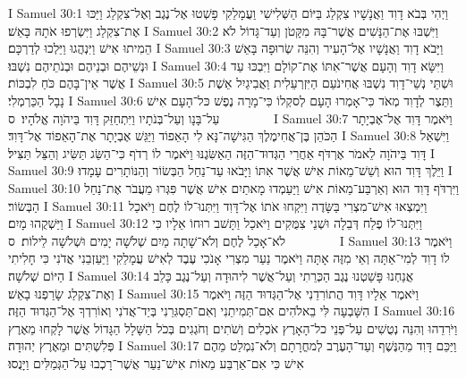 I Samuel 30:1	וַיְהִי בְּבֹא דָוִד וַאֲנָשָׁיו צִקְלַג בַּיּוֹם הַשְּׁלִישִׁי וַעֲמָלֵקִי פָשְׁטוּ אֶל־נֶגֶב וְאֶל־צִקְלַג וַיַּכּוּ אֶת־צִקְלַג וַיִּשְׂרְפוּ אֹתָהּ בָּאֵשׁ׃
I Samuel 30:2	וַיִּשְׁבּוּ אֶת־הַנָּשִׁים אֲשֶׁר־בָּהּ מִקָּטֹן וְעַד־גָּדוֹל לֹא הֵמִיתוּ אִישׁ וַיִּנְהֲגוּ וַיֵּלְכוּ לְדַרְכָּם׃
I Samuel 30:3	וַיָּבֹא דָוִד וַאֲנָשָׁיו אֶל־הָעִיר וְהִנֵּה שְׂרוּפָה בָּאֵשׁ וּנְשֵׁיהֶם וּבְנֵיהֶם וּבְנֹתֵיהֶם נִשְׁבּוּ׃
I Samuel 30:4	וַיִּשָּׂא דָוִד וְהָעָם אֲשֶׁר־אִתּוֹ אֶת־קוֹלָם וַיִּבְכּוּ עַד אֲשֶׁר אֵין־בָּהֶם כֹּחַ לִבְכּוֹת׃
I Samuel 30:5	וּשְׁתֵּי נְשֵׁי־דָוִד נִשְׁבּוּ אֲחִינֹעַם הַיִּזְרְעֵלִית וַאֲבִיגַיִל אֵשֶׁת נָבָל הַכַּרְמְלִי׃
I Samuel 30:6	וַתֵּצֶר לְדָוִד מְאֹד כִּי־אָמְרוּ הָעָם לְסקְלוֹ כִּי־מָרָה נֶפֶשׁ כּל־הָעָם אִישׁ עַל־בָּנָו וְעַל־בְּנֹתָיו וַיִּתְחַזֵּק דָּוִד בַּיהֹוָה אֱלֹהָיו׃ {ס}        
I Samuel 30:7	וַיֹּאמֶר דָּוִד אֶל־אֶבְיָתָר הַכֹּהֵן בֶּן־אֲחִימֶלֶךְ הַגִּישָׁה־נָּא לִי הָאֵפוֹד וַיַּגֵּשׁ אֶבְיָתָר אֶת־הָאֵפוֹד אֶל־דָּוִד׃
I Samuel 30:8	וַיִּשְׁאַל דָּוִד בַּיהֹוָה לֵאמֹר אֶרְדֹּף אַחֲרֵי הַגְּדוּד־הַזֶּה הַאַשִּׂגֶנּוּ וַיֹּאמֶר לוֹ רְדֹף כִּי־הַשֵּׂג תַּשִּׂיג וְהַצֵּל תַּצִּיל׃
I Samuel 30:9	וַיֵּלֶךְ דָּוִד הוּא וְשֵׁשׁ־מֵאוֹת אִישׁ אֲשֶׁר אִתּוֹ וַיָּבֹאוּ עַד־נַחַל הַבְּשׂוֹר וְהַנּוֹתָרִים עָמָדוּ׃
I Samuel 30:10	וַיִּרְדֹּף דָּוִד הוּא וְאַרְבַּע־מֵאוֹת אִישׁ וַיַּעַמְדוּ מָאתַיִם אִישׁ אֲשֶׁר פִּגְּרוּ מֵעֲבֹר אֶת־נַחַל הַבְּשׂוֹר׃
I Samuel 30:11	וַיִּמְצְאוּ אִישׁ־מִצְרִי בַּשָּׂדֶה וַיִּקְחוּ אֹתוֹ אֶל־דָּוִד וַיִּתְּנוּ־לוֹ לֶחֶם וַיֹּאכַל וַיַּשְׁקֻהוּ מָיִם׃
I Samuel 30:12	וַיִּתְּנוּ־לוֹ פֶלַח דְּבֵלָה וּשְׁנֵי צִמֻּקִים וַיֹּאכַל וַתָּשׁב רוּחוֹ אֵלָיו כִּי לֹא־אָכַל לֶחֶם וְלֹא־שָׁתָה מַיִם שְׁלֹשָׁה יָמִים וּשְׁלֹשָׁה לֵילוֹת׃ {ס}        
I Samuel 30:13	וַיֹּאמֶר לוֹ דָוִד לְמִי־אַתָּה וְאֵי מִזֶּה אָתָּה וַיֹּאמֶר נַעַר מִצְרִי אָנֹכִי עֶבֶד לְאִישׁ עֲמָלֵקִי וַיַּעַזְבֵנִי אֲדֹנִי כִּי חָלִיתִי הַיּוֹם שְׁלֹשָׁה׃
I Samuel 30:14	אֲנַחְנוּ פָּשַׁטְנוּ נֶגֶב הַכְּרֵתִי וְעַל־אֲשֶׁר לִיהוּדָה וְעַל־נֶגֶב כָּלֵב וְאֶת־צִקְלַג שָׂרַפְנוּ בָאֵשׁ׃
I Samuel 30:15	וַיֹּאמֶר אֵלָיו דָּוִד הֲתוֹרִדֵנִי אֶל־הַגְּדוּד הַזֶּה וַיֹּאמֶר הִשָּׁבְעָה לִּי בֵאלֹהִים אִם־תְּמִיתֵנִי וְאִם־תַּסְגִּרֵנִי בְּיַד־אֲדֹנִי וְאוֹרִדְךָ אֶל־הַגְּדוּד הַזֶּה׃
I Samuel 30:16	וַיֹּרִדֵהוּ וְהִנֵּה נְטֻשִׁים עַל־פְּנֵי כל־הָאָרֶץ אֹכְלִים וְשֹׁתִים וְחֹגְגִים בְּכֹל הַשָּׁלָל הַגָּדוֹל אֲשֶׁר לָקְחוּ מֵאֶרֶץ פְּלִשְׁתִּים וּמֵאֶרֶץ יְהוּדָה׃
I Samuel 30:17	וַיַּכֵּם דָּוִד מֵהַנֶּשֶׁף וְעַד־הָעֶרֶב לְמחֳרָתָם וְלֹא־נִמְלַט מֵהֶם אִישׁ כִּי אִם־אַרְבַּע מֵאוֹת אִישׁ־נַעַר אֲשֶׁר־רָכְבוּ עַל־הַגְּמַלִּים וַיָּנֻסוּ׃
